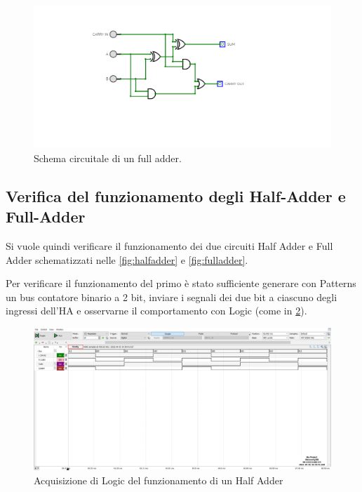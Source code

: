 \documentclass[10pt, a4paper, italian]{article}
\begin{document}
\begin{figure}[htbp]
    \centering
    \includegraphics[width=0.6\linewidth]{full}
    \caption{Schema circuitale di un full adder.
    \label{fig: fulladder}}
\end{figure}

\subsection{Verifica del funzionamento degli Half-Adder e Full-Adder}
Si vuole quindi verificare il funzionamento dei due circuiti Half Adder e Full Adder
schematizzati nelle \cref{fig:halfadder} e \cref{fig:fulladder}.

Per verificare il funzionamento del primo è stato sufficiente generare con
Patterns un bus contatore binario a 2 bit, inviare i segnali dei due bit a
ciascuno degli ingressi dell'HA e osservarne il comportamento con Logic
(come in \cref{fig: HA_log}).
\begin{figure}[htbp]
	\centering
	\includegraphics[width=\textwidth]{half_time}
	\caption{Acquisizione di Logic del funzionamento di un Half Adder
	\label{fig: HA_log}}
\end{figure}
\end{document}
